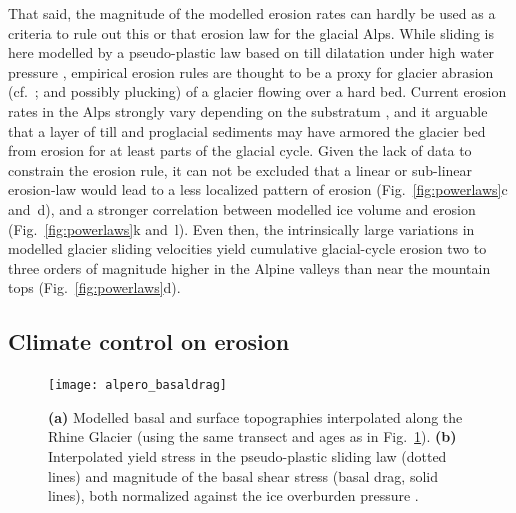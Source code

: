 \documentclass[esurf, manuscript]{copernicus}
\begin{document}
    That said, the magnitude of the modelled erosion rates can hardly be used
    as a criteria to rule out this or that erosion law for the glacial Alps.
    While sliding is here modelled by a pseudo-plastic law based on
    till dilatation under high water pressure \citep{Tulaczyk.etal.2000},
    empirical erosion rules are thought to be a proxy for glacier abrasion
    (cf.~\citealp{Hallet.1979}; and possibly plucking) of a glacier flowing
    over a hard bed. Current erosion rates in the Alps strongly vary depending
    on the substratum \citep{Steinemann.etal.2020, Steinemann.etal.2021}, and
    it arguable that a layer of till and proglacial sediments may have armored
    the glacier bed from erosion for at least parts of the glacial cycle.
    Given the lack of data to constrain the erosion rule, it can not
    be excluded that a linear or sub-linear erosion-law
    \citep[e.g.,][]{Cook.etal.2020} would lead to a less localized pattern of
    erosion (Fig.~\ref{fig:powerlaws}c and~d), and a stronger correlation
    between modelled ice volume and erosion (Fig.~\ref{fig:powerlaws}k and~l).
    Even then, the intrinsically large variations in modelled glacier sliding
    velocities yield cumulative glacial-cycle erosion two to three orders of
    magnitude higher in the Alpine valleys than near the mountain tops
    (Fig.~\ref{fig:powerlaws}d).


\subsection{Climate control on erosion}

    \begin{figure}[ht]
      \centerline{\texttt{[image: alpero\_basaldrag]}}
      \caption{%
        \textbf{(a)} Modelled basal and surface topographies interpolated along
        the Rhine Glacier (using the same transect and ages as in
        Fig.~\ref{fig:basaldrag}).
        \textbf{(b)} Interpolated yield stress in the pseudo-plastic sliding law
        (dotted lines) and magnitude of the basal shear stress (basal drag,
        solid lines), both normalized against the ice overburden pressure
        \citep[cf.][for model physics]{Seguinot.2014, Seguinot.etal.2016}.}
      \label{fig:basaldrag}
    \end{figure}
\end{document}
